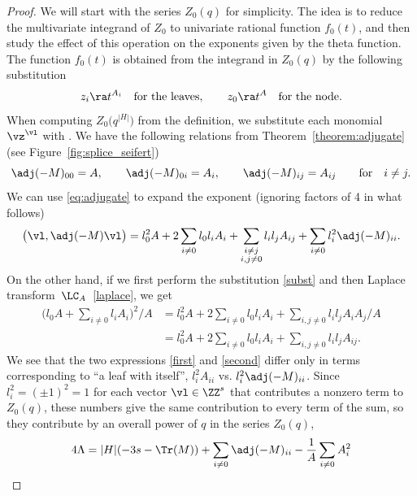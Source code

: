 \documentclass[pdftex]{sigma}
\begin{document}
\begin{proof}
	We will start with the series $Z_0(q)$ for simplicity. The idea is to reduce the multivariate integrand of $Z_0$ to univariate rational function $f_0(t)$, and then study the effect of this operation on the exponents given by the theta function. The function $f_0(t)$ is obtained from the integrand in $Z_0(q)$ by the following substitution
	\begin{gather}\label{subst}
			z_i \ra t^{A_i} \quad\mbox{for the leaves},\qquad
			z_0 \ra t^A \quad \mbox{for the node}.
	\end{gather}
	When computing $Z_0\bigl(q^{|H|}\bigr)$ from the definition, we substitute each monomial $\vz ^{\vl}$ with .
 We have the following relations from Theorem~\ref{theorem:adjugate} (see Figure~\ref{fig:splice_seifert})
 \begin{equation}\label{eq:adjugate}
 \adj(-M)_{00} = A, \qquad \adj(-M)_{0i} = A_i, \qquad \adj(-M)_{ij} = A_{ij}\qquad \text{for}\quad i \neq j.
 \end{equation}
 We can use \eqref{eq:adjugate} to expand the exponent (ignoring factors of 4 in what follows)
	\begin{equation}\label{first}
		\bigl(\vl, \adj(-M)\vl\bigr) = l_0^2 A+2\sum_{i\neq 0} l_0l_i A_{i} + \sum_{\substack{i \neq j\\ i,j \neq 0}} l_i l_j A_{ij}+\sum_{i\neq 0} l_i^2 \adj(-M)_{ii}.
	\end{equation}
	On the other hand, if we first perform the substitution \eqref{subst} and then Laplace transform~$\LC_A$~\eqref{laplace}, we get
	\begin{align}
\biggl(l_0 A + \sum_{i\neq 0}l_i A_i \biggr)^2/A & = l_0^2 A + 2 \sum_{i\neq 0} l_0 l_i A_i + \sum_{i, j\neq 0} l_i l_j A_{i}A_{j}/A \nonumber \\
& = l_0^2 A + 2 \sum_{i\neq 0} l_0 l_i A_i + \sum_{i, j\neq 0} l_i l_j A_{ij}.\label{second}
 \end{align}
We see that the two expressions \eqref{first} and \eqref{second} differ only in terms corresponding to ``a leaf with itself'', $l_i^2 A_{ii}$ vs. $l_i^2 \adj(-M)_{ii}$. Since $l_i^2 = (\pm 1)^2 = 1$ for each vector $\vl \in \ZZ^s$ that contributes a nonzero term to $Z_0(q)$, these numbers give the same contribution to every term of the sum, so they contribute by an overall power of $q$ in the series $Z_0(q)$,
 \begin{align}
		4\Lambda
		 & = |H| (-3s - \Tr(M)) + \sum_{i\neq 0}\adj(-M)_{ii} - \frac{1}{A}\sum_{i\neq 0} A_i^2 \nonumber\\

\end{align}
\end{proof}
\end{document}

